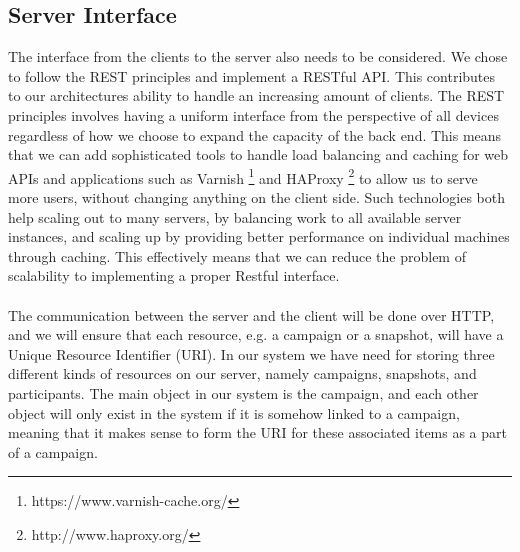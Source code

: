 \subsection{Server Interface}
\label{sub:server_interface}
The interface from the clients to the server also needs to be considered. We chose to follow the REST principles  and implement a RESTful API. This contributes to our architectures ability to handle an increasing amount of clients. The REST principles involves having a uniform interface from the perspective of all devices regardless of how we choose to expand the capacity of the back end. This means that we can add sophisticated tools to handle load balancing and caching for web APIs and applications such as Varnish \footnote{https://www.varnish-cache.org/} and HAProxy \footnote{http://www.haproxy.org/} to allow us to serve more users, without changing anything on the client side. Such technologies both help scaling out to many servers, by balancing work to all available server instances, and scaling up by providing better performance on individual machines through caching. This effectively means that we can reduce the problem of scalability to implementing a proper Restful interface. 
\\\\
The communication between the server and the client will be done over HTTP, and we will ensure that each resource, e.g. a campaign or a snapshot, will have a Unique Resource Identifier (URI). In our system we have need for storing three different kinds of resources on our server, namely campaigns, snapshots, and participants. The main object in our system is the campaign, and each other object will only exist in the system if it is somehow linked to a campaign, meaning that it makes sense to form the URI for these associated items as a part of a campaign. 

